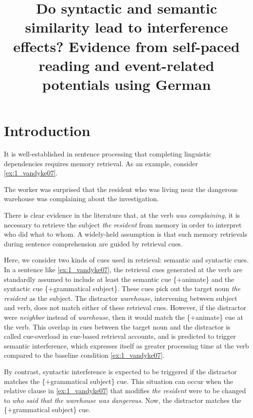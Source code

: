 \documentclass[a4paper, man, floatsintext]{apa7}
\title{\hspace{1cm} Do syntactic and semantic similarity lead to interference effects?\newline
Evidence from self-paced reading and event-related potentials using German}
\affiliation{
Department of Linguistics, University of Potsdam}
\begin{document}
\maketitle

\section{Introduction}

It is well-established in sentence processing that completing linguistic dependencies requires memory retrieval. As an example, consider 
\ref{ex:1_vandyke07}.

\begin{exe}[ht]
\ex \label{ex:1_vandyke07} 
The worker was surprised that the resident who was living near the dangerous warehouse was complaining about the investigation. \parencite{vandyke07}
\end{exe}

There is clear evidence in the literature  \parencite[e.g.,][]{jaeger_etal_2020, nicenboim, vandyke_mcelree06, vandyke_lewis03} that, at the verb \textit{was complaining}, it is necessary to retrieve the subject \textit{the resident} from memory in order to interpret who did what to whom. A widely-held assumption is that such memory retrievals during sentence comprehension are guided by retrieval cues. 

Here, we consider two kinds of cues used in retrieval: semantic and  syntactic cues.
In a sentence like \ref{ex:1_vandyke07}, the retrieval cues generated at the verb are standardly assumed to include at least  the semantic cue \{+animate\} and the syntactic cue \{+grammatical subject\}. These cues pick out the target noun \textit{the resident} as the subject. The distractor \textit{warehouse}, intervening between subject and verb, does not match either of these retrieval cues. However, if the distractor were \textit{neighbor} instead of \textit{warehouse}, then it would match the \{+animate\} cue at the verb. This overlap in cues between the target noun and the distractor is called cue-overload in cue-based retrieval accounts, and is predicted to trigger semantic interference, which expresses itself as greater processing time at the verb compared to the baseline condition \ref{ex:1_vandyke07}.

By contrast, syntactic interference is expected to be triggered if the distractor matches the \{+grammatical subject\} cue. This situation can occur when the relative clause  in \ref{ex:1_vandyke07} that modifies \textit{the resident} were to be changed to \textit{who said that the warehouse was dangerous}. Now, the distractor matches the \{+grammatical subject\} cue. 
\end{document}
